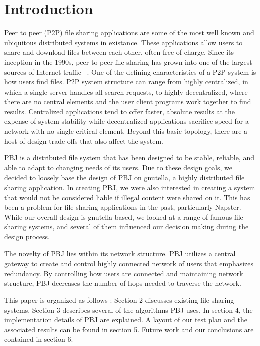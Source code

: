 \documentclass{acm_proc_article-sp}
\begin{document}
\section{Introduction}
Peer to peer (P2P) file sharing applications are some of the most well known and ubiquitous distributed systems in existance. These applications allow users to share and download files between each other, often free of charge.  Since its inception in the 1990s, peer to peer file sharing has grown into one of the largest sources of Internet traffic ~\cite{study}. One of the defining characteristics of a P2P system is how users find files. P2P system structure can range from highly centralized, in which a single server handles all search requests, to highly decentralized, where there are no central elements and the user client programs work together to find results. Centralized applications tend to offer faster, absolute results at the expense of system stability while decentralized applications sacrifice speed for a network with no single critical element.   Beyond this basic topology, there are a host of design trade offs that also affect the system.

PBJ is a distributed file system that has been designed to be stable, reliable, and able to adapt to changing needs of its users. Due to these design goals, we decided to loosely base the design of PBJ on gnutella, a highly distributed file sharing application. In creating PBJ, we were also interested in creating a system that  would not be considered liable if illegal content were shared on it. This has been a problem for file sharing applications in the past, particularly Napster. While our overall design is gnutella based, we looked at a range of famous file sharing systems, and several of them influenced our decision making during the design process.

 The novelty of PBJ lies within its network structure. PBJ utilizes a central gateway to create and control highly connected network of users that emphasizes redundancy. By controlling how users are connected and maintaining network structure, PBJ decreases the number of hops needed to traverse the network.

 This paper is organized as follows : Section 2 discusses existing file sharing systems. Section 3 describes several of the algorithms PBJ uses. In section 4, the implementation details of PBJ are explained. A layout of our test plan and the associated results can be found in section 5.  Future work and our conclusions are contained in section 6.   
\end{document}

